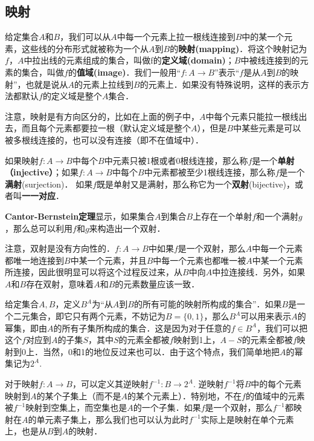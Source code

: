 \subsection{映射}

给定集合$A$和$B$，我们可以从$A$中每一个元素上拉一根线连接到$B$中的某一个元素，这些线的分布形式就被称为一个从$A$到$B$的\textbf{映射(mapping)}．将这个映射记为$f$，$A$中拉出线的元素组成的集合，叫做f的\textbf{定义域(domain)}；$B$中被线连接到的元素的集合，叫做$f$的\textbf{值域(image)}．我们一般用“$f:A\rightarrow B$”表示“$f$是从$A$到$B$的映射”，也就是说从$A$的元素上拉线到$B$的元素上．如果没有特殊说明，这样的表示方法都默认$f$的定义域是整个$A$集合．

注意，映射是有方向区分的，比如在上面的例子中，$A$中每个元素只能拉一根线出去，而且每个元素都要拉一根（默认定义域是整个$A$），但是$B$中某些元素是可以被多根线连接的，也可以没有连接（即不在值域中）．

如果映射$f:A\rightarrow B$中每个$B$中元素只被1根或者0根线连接，那么称$f$是一个\textbf{单射（injective）}；如果$f:A\rightarrow B$中每个$B$中元素都被至少1根线连接，那么称$f$是一个\textbf{满射}(surjection)． 如果$f$既是单射又是满射，那么称它为一个\textbf{双射}(bijective)，或者叫\textbf{一一对应}．

\textbf{Cantor-Bernstein定理}显示，如果集合$A$到集合$B$上存在一个单射$f$和一个满射$g$，那么总可以利用$f$和$g$来构造出一个双射．

注意，双射是没有方向性的．$f:A\rightarrow B$中如果$f$是一个双射，那么$A$中每一个元素都唯一地连接到$B$中某一个元素，并且$B$中每一个元素也都唯一被$A$中某一个元素所连接，因此很明显可以将这个过程反过来，从$B$中向$A$中拉连接线．另外，如果$A$和$B$存在双射，意味着$A$和$B$的元素数量应该一致．

给定集合$A, B$，定义$B^A$为“从$A$到$B$的所有可能的映射所构成的集合”．如果$B$是一个二元集合，即它只有两个元素，不妨记为$B=\{0,1\}$，那么$B^A$可以用来表示$A$的幂集，即由$A$的所有子集所构成的集合．这是因为对于任意的$f\in B^A$，我们可以把这个$f$对应到$A$的子集$S$，其中$S$的元素全都被$f$映射到1上，$A-S$的元素全都被$f$映射到0上．当然，0和1的地位反过来也可以．由于这个特点，我们简单地把$A$的幂集记为$2^A$. 

对于映射$f:A\rightarrow B$，可以定义其逆映射$f^{-1}:B\rightarrow 2^A$. 逆映射$f^{-1}$将$B$中的每个元素映射到$A$的某个子集上（而不是$A$的某个元素上）．特别地，不在$f$的值域中的元素被$f^{-1}$映射到空集上，而空集也是$A$的一个子集．如果$f$是一个双射，那么$f^{-1}$都映射在$A$的单元素子集上，那么我们也可以认为此时$f^{-1}$实际上是映射在单个元素上，也是从$B$到$A$的映射．

